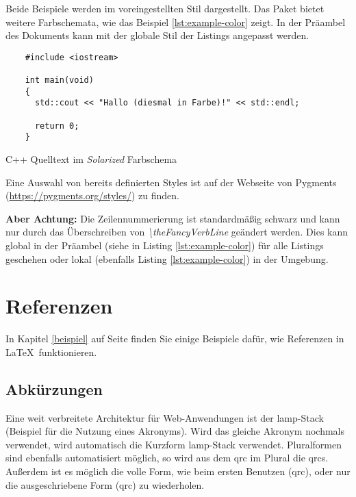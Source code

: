 Beide Beispiele werden im voreingestellten Stil dargestellt.
Das Paket  bietet weitere Farbschemata, wie das Beispiel \ref{lst:example-color} zeigt.
In der Präambel des Dokuments kann mit \texttt{} der globale Stil der Listings angepasst werden.

\begin{listing}[!htbp]
  \renewcommand\theFancyVerbLine{%
    \rmfamily
    \textcolor[rgb]{0.7,0.7,0.7}{\tiny {\arabic{FancyVerbLine}}}%
  }
  \begin{verbatim}
    #include <iostream>

    int main(void)
    {
      std::cout << "Hallo (diesmal in Farbe)!" << std::endl;

      return 0;
    }
  \end{verbatim}
  \caption{C++ Quelltext im \textit{Solarized} Farbschema}
  \label{lst:example-color}
\end{listing}

Eine Auswahl von bereits definierten Styles ist auf der Webseite von Pygments (\url{https://pygments.org/styles/}) zu finden.

\textbf{Aber Achtung:} Die Zeilennummerierung ist standardmäßig schwarz und kann nur durch das Überschreiben von \textit{\textbackslash theFancyVerbLine} geändert werden.
Dies kann global in der Präambel (siehe  in Listing \ref{lst:example-color}) für alle Listings geschehen oder lokal (ebenfalls Listing \ref{lst:example-color}) in der  Umgebung.


\section{Referenzen}
\label{refn}

In Kapitel \ref{beispiel} auf Seite \pageref{refn} finden Sie einige Beispiele dafür, wie Referenzen in \LaTeX~funktionieren.

\subsection{Abkürzungen}

Eine weit verbreitete Architektur für Web-Anwendungen ist der \gls{lamp}-Stack (Beispiel für die Nutzung eines Akronyms).
Wird das gleiche Akronym nochmals verwendet, wird automatisch die Kurzform \gls{lamp}-Stack verwendet.
Pluralformen sind ebenfalls automatisiert möglich, so wird aus dem \gls{qrc} im Plural die \glspl{qrc}.
Außerdem ist es möglich die volle Form, wie beim ersten Benutzen (\acrfull{qrc}), oder nur die ausgeschriebene Form (\acrlong{qrc}) zu wiederholen.

